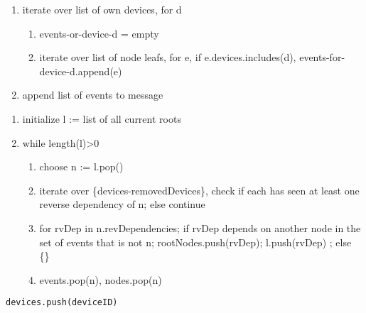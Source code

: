 
\begin{enumerate}
    \item iterate over list of own devices, for d
    \begin{enumerate}
        \item events-or-device-d = empty
        \item iterate over list of node leafs, for e, if e.devices.includes(d), events-for-device-d.append(e)
    \end{enumerate}
    \item append list of events to message
\end{enumerate}

\begin{enumerate}
    \item initialize l := list of all current roots
    \item while length(l)>0 
    \begin{enumerate}
        \item choose n := l.pop()
        \item iterate over \{devices-removedDevices\}, check if each has seen at least one reverse dependency of n; else continue
        \item for rvDep in n.revDependencies;  if rvDep depends on another node in the set of events that is not n; rootNodes.push(rvDep); l.push(rvDep) ; else \{\}
        \item events.pop(n), nodes.pop(n)
    \end{enumerate}
\end{enumerate}

\noindent
\texttt{devices.push(deviceID)}




